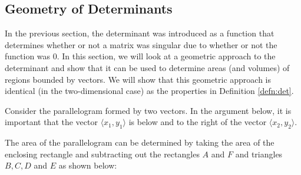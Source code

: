 \subsection{Geometry of Determinants}


In the previous section, the determinant was introduced as a function that determines whether or not a matrix was singular due to whether or not the function was 0.  In this section, we will look at a geometric approach to the determinant and show that it can be used to determine areas (and volumes) of regions bounded by vectors.  We will show that this geometric approach is identical (in the two-dimensional case) as the properties in Definition \ref{defn:det}.


Consider the parallelogram formed by two vectors. In the argument below, it is important that the vector $\langle x_1, y_1 \rangle$ is below and to the right of the vector $\langle x_2, y_2 \rangle$.
%
\begin{center}
\end{center}

The area of the parallelogram can be determined by taking the area of the enclosing rectangle and subtracting out the rectangles $A$ and $F$ and triangles $B, C, D$ and $E$ as shown below:

\begin{center}
\end{center}

